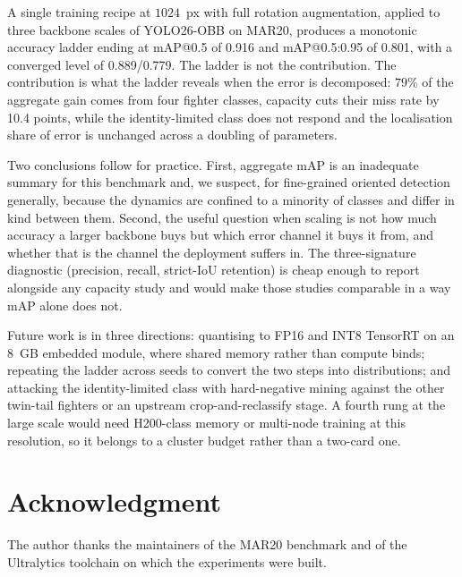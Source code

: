 \documentclass[conference]{IEEEtran}
\begin{document}
A single training recipe at $1024$~px with full rotation augmentation, applied to
three backbone scales of YOLO26-OBB on MAR20, produces a monotonic accuracy ladder
ending at mAP@0.5 of 0.916 and mAP@0.5:0.95 of 0.801, with a converged level of
0.889/0.779. The ladder is not the contribution. The contribution is what the
ladder reveals when the error is decomposed: $79\%$ of the aggregate gain comes
from four fighter classes, capacity cuts their miss rate by 10.4 points, while
the identity-limited class does not respond and the localisation share of error
is unchanged across a doubling of parameters.

Two conclusions follow for practice. First, aggregate mAP is an inadequate
summary for this benchmark and, we suspect, for fine-grained oriented detection
generally, because the dynamics are confined to a minority of classes and differ
in kind between them. Second, the useful question when scaling is not how much
accuracy a larger backbone buys but which error channel it buys it from, and
whether that is the channel the deployment suffers in. The three-signature
diagnostic (precision, recall, strict-IoU retention) is cheap enough to report
alongside any capacity study and would make those studies comparable in a way
mAP alone does not.

Future work is in three directions: quantising to FP16 and INT8 TensorRT on an
8~GB embedded module, where shared memory rather than compute binds; repeating
the ladder across seeds to convert the two steps into distributions; and
attacking the identity-limited class with hard-negative mining against the other
twin-tail fighters or an upstream crop-and-reclassify stage. A fourth rung at the
large scale would need H200-class memory or multi-node training at this
resolution, so it belongs to a cluster budget rather than a two-card one.

\section*{Acknowledgment}
The author thanks the maintainers of the MAR20 benchmark and of the Ultralytics
toolchain on which the experiments were built.
\end{document}
